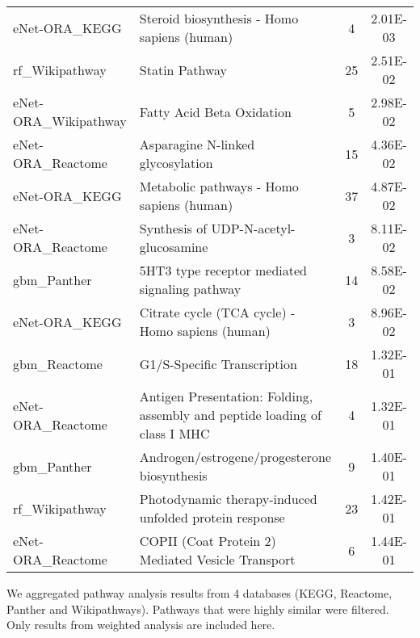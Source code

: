 \begin{sidewaystable}
\begin{threeparttable}
\begin{tabular}{llcc}
          eNet-ORA\_KEGG & Steroid biosynthesis - Homo sapiens (human) & 4     & 2.01E-03 \\
          rf\_Wikipathway & Statin Pathway & 25    & 2.51E-02 \\
          eNet-ORA\_Wikipathway & Fatty Acid Beta Oxidation & 5     & 2.98E-02 \\
          eNet-ORA\_Reactome & Asparagine N-linked glycosylation & 15    & 4.36E-02 \\
          eNet-ORA\_KEGG & Metabolic pathways - Homo sapiens (human) & 37    & 4.87E-02 \\
          eNet-ORA\_Reactome & Synthesis of UDP-N-acetyl-glucosamine & 3     & 8.11E-02 \\
          gbm\_Panther & 5HT3 type receptor mediated signaling pathway & 14    & 8.58E-02 \\
          eNet-ORA\_KEGG & Citrate cycle (TCA cycle) - Homo sapiens (human) & 3     & 8.96E-02 \\
          gbm\_Reactome & G1/S-Specific Transcription & 18    & 1.32E-01 \\
          eNet-ORA\_Reactome & \multicolumn{1}{p{26.085em}}{Antigen Presentation: Folding, assembly and peptide loading of \newline{}class I MHC} & 4     & 1.32E-01 \\
          gbm\_Panther & Androgen/estrogene/progesterone biosynthesis & 9     & 1.40E-01 \\
          rf\_Wikipathway & Photodynamic therapy-induced unfolded protein response & 23    & 1.42E-01 \\
          eNet-ORA\_Reactome & COPII (Coat Protein 2) Mediated Vesicle Transport & 6     & 1.44E-01 \\
          \bottomrule
          \end{tabular}%
        \begin{tablenotes}
          \item We aggregated pathway analysis results from 4 databases (KEGG, Reactome, Panther and Wikipathways). Pathways that were highly similar were filtered. Only results from weighted analysis are included here.
        \end{tablenotes}
      \end{threeparttable}
      \label{tab:addlabel}%
    \end{sidewaystable}%

